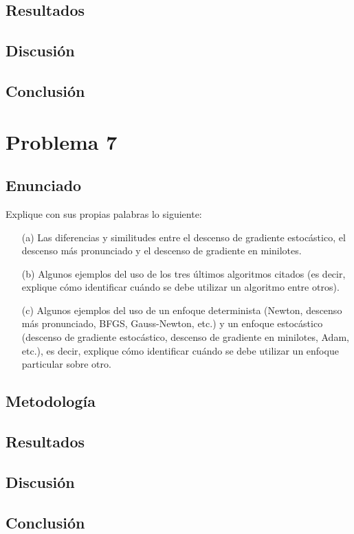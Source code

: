 \documentclass{article}
\begin{document}
\subsection{Resultados}
\setcounter{equation}{0}

\subsection{Discusión}

\subsection{Conclusión}

\section{Problema 7}

\subsection{Enunciado}

Explique con sus propias palabras lo siguiente:

\begin{itemize}
    \item[(a)] Las diferencias y similitudes entre el descenso de gradiente estocástico, el descenso más pronunciado y el descenso de gradiente en minilotes.
    \item[(b)] Algunos ejemplos del uso de los tres últimos algoritmos citados (es decir, explique cómo identificar cuándo se debe utilizar un algoritmo entre otros).
    \item[(c)] Algunos ejemplos del uso de un enfoque determinista (Newton, descenso más pronunciado, BFGS, Gauss-Newton, etc.) y un enfoque estocástico (descenso de gradiente estocástico, descenso de gradiente en minilotes, Adam, etc.), es decir, explique cómo identificar cuándo se debe utilizar un enfoque particular sobre otro.

\end{itemize}

\subsection{Metodología}

\subsection{Resultados}
\setcounter{equation}{0}

\subsection{Discusión}

\subsection{Conclusión}
\end{document}
